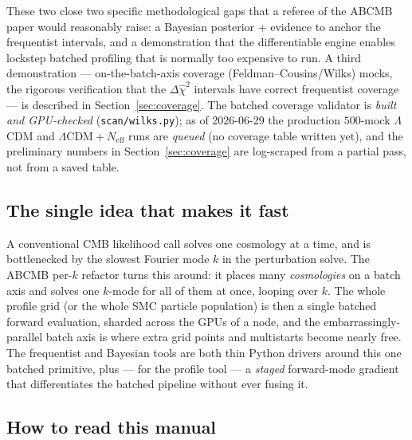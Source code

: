 \documentclass[11pt]{article}
\newcommand{\file}[1]{\texttt{\small #1}}
\newcommand{\Neff}{N_{\mathrm{eff}}}
\newcommand{\dchisq}{\Delta\hat\chi^2}
\begin{document}
These two close two specific methodological gaps that a referee of the
\textsc{ABCMB} paper would reasonably raise: a Bayesian posterior +
evidence to anchor the frequentist intervals, and a demonstration that
the differentiable engine enables lockstep batched profiling that is
normally too expensive to run. A third demonstration ---
on-the-batch-axis coverage (Feldman--Cousins/Wilks) mocks, the rigorous
verification that the $\dchisq$ intervals have correct frequentist
coverage --- is described in Section~\ref{sec:coverage}. The batched
coverage validator is \emph{built and GPU-checked} (\file{scan/wilks.py});
as of 2026-06-29 the production $500$-mock $\Lambda$CDM and
$\Lambda\mathrm{CDM}+\Neff$ runs are \emph{queued} (no coverage table
written yet), and the preliminary numbers in Section~\ref{sec:coverage} are
log-scraped from a partial pass, not from a saved table.

\subsection{The single idea that makes it fast}

A conventional CMB likelihood call solves one cosmology at a time, and is
bottlenecked by the slowest Fourier mode $k$ in the perturbation solve.
The \textsc{ABCMB} per-$k$ refactor turns this around: it places many
\emph{cosmologies} on a batch axis and solves one $k$-mode for all of
them at once, looping over $k$. The whole profile grid (or the whole SMC
particle population) is then a single batched forward evaluation, sharded
across the GPUs of a node, and the embarrassingly-parallel batch axis is
where extra grid points and multistarts become nearly free. The
frequentist and Bayesian tools are both thin Python drivers around this
one batched primitive, plus --- for the profile tool --- a \emph{staged}
forward-mode gradient that differentiates the batched pipeline without
ever fusing it.

\subsection{How to read this manual}
\end{document}
